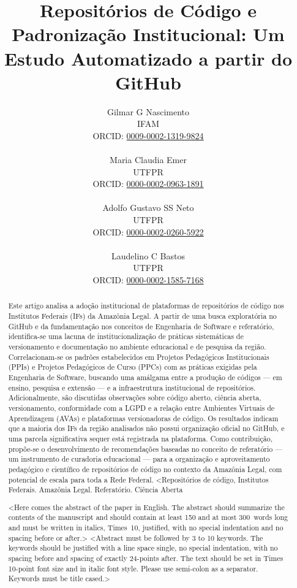 \documentclass[english, spanish, brazilian]{RBIEarticle}
\title{Repositórios de Código e Padronização Institucional: Um Estudo Automatizado a partir do GitHub}
\author{%
	\parbox{4cm}{%
		Gilmar G Nascimento\\
		IFAM\\
		ORCID: \href{https://orcid.org/0009-0002-1319-9824}{0009-0002-1319-9824}\\
	}
	\parbox{4cm}{%
		Maria Claudia Emer\\
		UTFPR\\
		ORCID: \href{https://orcid.org/0000-0002-0963-1891}{0000-0002-0963-1891}\\
	}
	\parbox{4cm}{%
		Adolfo Gustavo SS Neto\\
		UTFPR\\
		ORCID: \href{https://orcid.org/0000-0002-0260-5922}{0000-0002-0260-5922}\\
	}
	\parbox{4cm}{%
		Laudelino C Bastos\\
		UTFPR\\
		ORCID: \href{https://orcid.org/0000-0002-1585-7168}{0000-0002-1585-7168}\\
	}
}
\begin{document}
	
	\maketitle
	
\begin{otherlanguage}{brazilian}
\begin{abstract}
	Este artigo analisa a adoção institucional de plataformas de repositórios de código nos Institutos Federais (IFs) da Amazônia Legal. A partir de uma busca exploratória no GitHub e da fundamentação nos conceitos de Engenharia de Software e referatório, identifica-se uma lacuna de institucionalização de práticas sistemáticas de versionamento e documentação no ambiente educacional e de pesquisa da região. Correlacionam-se os padrões estabelecidos em Projetos Pedagógicos Institucionais (PPIs) e Projetos Pedagógicos de Curso (PPCs) com as práticas exigidas pela Engenharia de Software, buscando uma amálgama entre a produção de códigos — em ensino, pesquisa e extensão — e a infraestrutura institucional de repositórios. Adicionalmente, são discutidas observações sobre código aberto, ciência aberta, versionamento, conformidade com a LGPD e a relação entre Ambientes Virtuais de Aprendizagem (AVAs) e plataformas versionadoras de código. Os resultados indicam que a maioria dos IFs da região analisados não possui organização oficial no GitHub, e uma parcela significativa sequer está registrada na plataforma. Como contribuição, propõe-se o desenvolvimento de recomendações baseadas no conceito de referatório — um instrumento de curadoria educacional — para a organização e aproveitamento pedagógico e científico de repositórios de código no contexto da Amazônia Legal, com potencial de escala para toda a Rede Federal.
\keywords <Repositórios de código, Institutos Federais. Amazônia Legal. Referatório. Ciência Aberta
\end{abstract}

\end{otherlanguage}

\begin{otherlanguage}{english}
\begin{abstract}
<Here comes the abstract of the paper in English. The abstract should summarize the contents of the manuscript and should contain at least 150 and at most 300~words long and must be written in italics, Times~10, justified, with no special indentation and no spacing before or after.>
\keywords <Abstract must be followed by 3 to 10 keywords. The keywords should be justified with a line space single, no special indentation, with no spacing before and spacing of exactly 24-points after. The text should be set in Times 10-point font size and in italic font style. Please use semi-colon as a separator. Keywords must be title cased.>
\end{abstract}
\end{otherlanguage}
\end{document}
